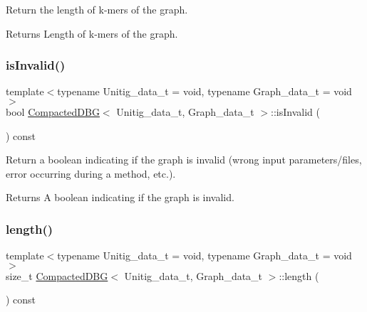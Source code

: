 Return the length of k-\/mers of the graph. 

\begin{DoxyReturn}{Returns}
Length of k-\/mers of the graph. 
\end{DoxyReturn}
\mbox{\label{classCompactedDBG_a5c2e72fe85306aa4ac190ae9b3e9b3a7}} 
\subsubsection{\texorpdfstring{is\+Invalid()}{isInvalid()}}
{\footnotesize\ttfamily template$<$typename Unitig\+\_\+data\+\_\+t = void, typename Graph\+\_\+data\+\_\+t = void$>$ \\
bool \hyperlink{classCompactedDBG}{Compacted\+D\+BG}$<$ Unitig\+\_\+data\+\_\+t, Graph\+\_\+data\+\_\+t $>$\+::is\+Invalid (\begin{DoxyParamCaption}{ }\end{DoxyParamCaption}) const\hspace{0.3cm}{\ttfamily [inline]}}



Return a boolean indicating if the graph is invalid (wrong input parameters/files, error occurring during a method, etc.). 

\begin{DoxyReturn}{Returns}
A boolean indicating if the graph is invalid. 
\end{DoxyReturn}
\mbox{\label{classCompactedDBG_a9f10000ce74e3b3cc6e9cc394cbaba3c}} 
\subsubsection{\texorpdfstring{length()}{length()}}
{\footnotesize\ttfamily template$<$typename Unitig\+\_\+data\+\_\+t = void, typename Graph\+\_\+data\+\_\+t = void$>$ \\
size\+\_\+t \hyperlink{classCompactedDBG}{Compacted\+D\+BG}$<$ Unitig\+\_\+data\+\_\+t, Graph\+\_\+data\+\_\+t $>$\+::length (\begin{DoxyParamCaption}{ }\end{DoxyParamCaption}) const}



